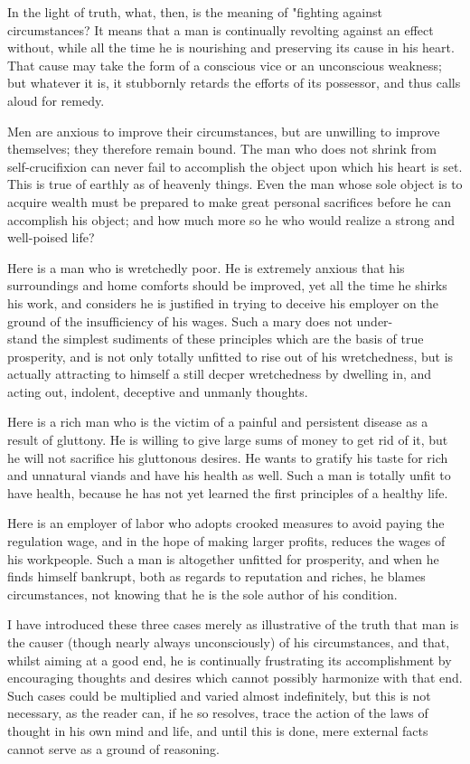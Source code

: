 \documentclass[10pt]{article}
\begin{document}
In the light of truth, what, then, is the meaning of "fighting against circumstances? It means that a man is continually revolting against an effect without, while all the time he is nourishing and preserving its cause in his heart. That cause may take the form of a conscious vice or an unconscious weakness; but whatever it is, it stubbornly retards the efforts of its possessor, and thus calls aloud for remedy.

Men are anxious to improve their circumstances, but are unwilling to improve themselves; they therefore remain bound. The man who does not shrink from self-crucifixion can never fail to accomplish the object upon which his heart is set. This is true of earthly as of heavenly things. Even the man whose sole object is to acquire wealth must be prepared to make great personal sacrifices before he can accomplish his object; and how much more so he who would realize a strong and well-poised life?

Here is a man who is wretchedly poor. He is extremely anxious that his surroundings and home comforts should be improved, yet all the time he shirks his work, and considers he is justified in trying to deceive his employer on the ground of the insufficiency of his wages. Such a mary does not under-\\
stand the simplest sudiments of these principles which are the basis of true prosperity, and is not only totally unfitted to rise out of his wretchedness, but is actually attracting to himself a still decper wretchedness by dwelling in, and acting out, indolent, deceptive and unmanly thoughts.

Here is a rich man who is the victim of a painful and persistent disease as a result of gluttony. He is willing to give large sums of money to get rid of it, but he will not sacrifice his gluttonous desires. He wants to gratify his taste for rich and unnatural viands and have his health as well. Such a man is totally unfit to have health, because he has not yet learned the first principles of a healthy life.

Here is an employer of labor who adopts crooked measures to avoid paying the regulation wage, and in the hope of making larger profits, reduces the wages of his workpeople. Such a man is altogether unfitted for prosperity, and when he finds himself bankrupt, both as regards to reputation and riches, he blames circumstances, not knowing that he is the sole author of his condition.

I have introduced these three cases merely as illustrative of the truth that man is the causer (though nearly always unconsciously) of his circumstances, and that, whilst aiming at a good end, he is continually frustrating its accomplishment by encouraging thoughts and desires which cannot possibly harmonize with that end. Such cases could be multiplied and varied almost indefinitely, but this is not necessary, as the reader can, if he so resolves, trace the action of the laws of thought in his own mind and life, and until this is done, mere external facts cannot serve as a ground of reasoning.
\end{document}
